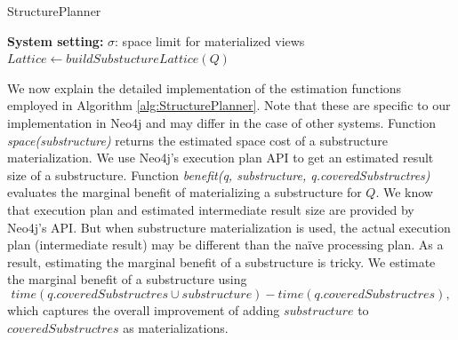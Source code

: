 \begin{algorithm}%
\label{alg:5}
\caption{StructurePlanner}
\LinesNumbered
\textbf{System setting:} $\sigma$: space limit for materialized views\\
$Lattice \leftarrow buildSubstuctureLattice(Q)$\;
\end{algorithm}

We now explain the detailed implementation of the estimation functions employed in Algorithm \ref{alg:StructurePlanner}. Note that these are specific to our implementation in Neo4j and may differ in the case of other systems. Function \textit{space(substructure)} returns the estimated space cost of a substructure materialization. We use Neo4j's execution plan API to get an estimated result size of a substructure. Function \textit{benefit(q, substructure, q.coveredSubstructres)} evaluates the marginal benefit of materializing a substructure for $Q$. We know that execution plan and estimated intermediate result size are provided by Neo4j's API. But when substructure materialization is used, the actual execution plan (intermediate result) may be different than the na\"ive processing plan. As a result, estimating the marginal benefit of a substructure is tricky. We estimate the marginal benefit of a substructure using
\begin{displaymath}
time(q.coveredSubstructres \cup substructure) - time(q.coveredSubstructres),
\end{displaymath}
\noindent which captures the overall improvement of adding $substructure$ to $coveredSubstructres$ as materializations.


